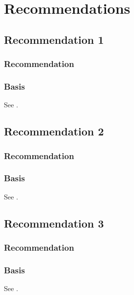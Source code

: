 \chapter{Recommendations}
\label{ch:recommendations}


\section{Recommendation 1}
\label{sec:rec:1}

\subsection{Recommendation}
\lipsum[1][1]

\subsection{Basis}
See .

\section{Recommendation 2}
\label{sec:rec:2}

\subsection{Recommendation}
\lipsum[2][1]

\subsection{Basis}
See .

\section{Recommendation 3}
\label{sec:rec:3}

\subsection{Recommendation}
\lipsum[3][1]

\subsection{Basis}
See .
